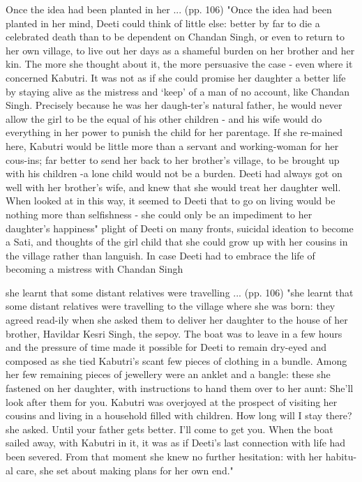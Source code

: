 Once the idea had been planted in her ... (pp. 106)
"Once the idea had been planted in her mind, Deeti could think of little else: better by far to die a celebrated death than to be dependent on Chandan Singh, or even to return to her own village, to live out her days as a shameful burden on her brother and her kin. The more she thought about it, the more persuasive the case - even where it concerned Kabutri. It was not as if she could promise her daughter a better life by staying alive as the mistress and ‘keep’ of a man of no account, like Chandan Singh. Precisely because he was her daugh-ter’s natural father, he would never allow the girl to be the equal of his other children - and his wife would do everything in her power to punish the child for her parentage. If she re-mained here, Kabutri would be little more than a servant and working-woman for her cous-ins; far better to send her back to her brother’s village, to be brought up with his children -a lone child would not be a burden. Deeti had always got on well with her brother’s wife, and knew that she would treat her daughter well. When looked at in this way, it seemed to Deeti that to go on living would be nothing more than selfishness - she could only be an impediment to her daughter’s happiness"
plight of Deeti on many fronts, suicidal ideation to become a Sati, and thoughts of the girl child that she could grow up with her cousins in the village rather than languish. In case Deeti had to embrace the life of becoming a mistress with Chandan Singh

she learnt that some distant relatives were travelling ... (pp. 106)
"she learnt that some distant relatives were travelling to the village where she was born: they agreed read-ily when she asked them to deliver her daughter to the house of her brother, Havildar Kesri Singh, the sepoy. The boat was to leave in a few hours and the pressure of time made it possible for Deeti to remain dry-eyed and composed as she tied Kabutri’s scant few pieces of clothing in a bundle. Among her few remaining pieces of jewellery were an anklet and a bangle: these she fastened on her daughter, with instructions to hand them over to her aunt: She’ll look after them for you. Kabutri was overjoyed at the prospect of visiting her cousins and living in a household filled with children. How long will I stay there? she asked. Until your father gets better. I’ll come to get you. When the boat sailed away, with Kabutri in it, it was as if Deeti’s last connection with life had been severed. From that moment she knew no further hesitation: with her habitu-al care, she set about making plans for her own end."

